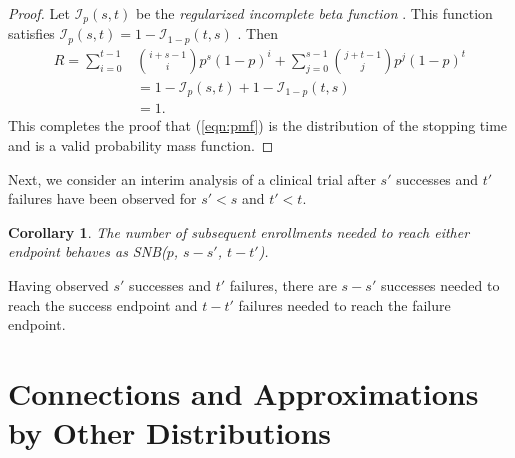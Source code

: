 \documentclass[review]{elsarticle}
\newtheorem{corollary}{Corollary}
\begin{document}
\begin{proof}
Let $\mathcal{I}_p(s, t)$ be the {\em regularized incomplete beta function} 
\citep{Olver2010}. This function satisfies 
$\mathcal{I}_p(s, t) = 1-\mathcal{I}_{1-p}(t, s)$ \citep{Uppuluri1970}. Then
\begin{align*}
R = \sum_{i=0}^{t-1} &{i+s-1 \choose i} p^s (1-p)^i +
\sum_{j=0}^{s-1}  {j+t-1 \choose j} p^j  (1-p)^t \\
   &= 1-\mathcal{I}_p(s, t) + 1 - \mathcal{I}_{1-p}(t, s) \\
   &= 1. 
\end{align*}
This completes the proof that (\ref{eqn:pmf}) is the distribution of the
stopping time and is a valid probability mass function.
\end{proof}

Next, we consider an interim analysis of a clinical trial after $s'$ 
successes and $t'$ failures have been observed for $s' < s$ and $t' < t$.
\begin{corollary} \label{conditional_distribution}
The number of subsequent enrollments needed 
to reach either endpoint behaves as SNB($p$, $s-s'$, $t-t'$).
\end{corollary}
Having observed $s'$
successes and $t'$ failures, there are $s-s'$ successes needed to reach the
success endpoint and $t-t'$ failures needed to reach the failure endpoint.

\section{Connections and Approximations by Other Distributions}
\end{document}
